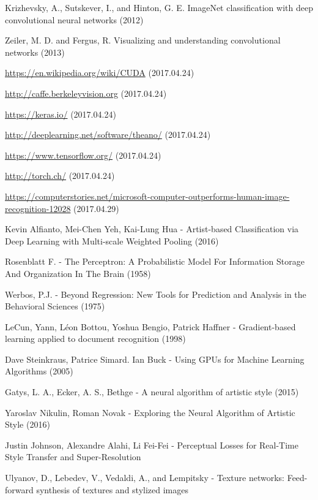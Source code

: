\documentclass[12pt, a4paper, oneside]{book}
\theoremstyle{tetel}
\begin{document}
\newpage
\begin{thebibliography}{1}

Krizhevsky, A., Sutskever, I., and Hinton, G. E. ImageNet classification with deep convolutional neural networks (2012)

Zeiler, M. D. and Fergus, R. Visualizing and understanding convolutional networks (2013)

\url {https://en.wikipedia.org/wiki/CUDA} (2017.04.24)

\url {http://caffe.berkeleyvision.org} (2017.04.24)

\url {https://keras.io/} (2017.04.24)

\url {http://deeplearning.net/software/theano/} (2017.04.24)

\url {https://www.tensorflow.org/} (2017.04.24)

\url {http://torch.ch/} (2017.04.24)

\url {https://computerstories.net/microsoft-computer-outperforms-human-image-recognition-12028} (2017.04.29)

Kevin Alfianto, Mei-Chen Yeh, Kai-Lung Hua - Artist-based Classification via Deep Learning with Multi-scale Weighted Pooling (2016)

Rosenblatt F. - The Perceptron: A Probabilistic Model For Information Storage And Organization In The Brain (1958)

Werbos, P.J. - Beyond Regression: New Tools for Prediction and Analysis in the Behavioral Sciences (1975)
 
LeCun, Yann, Léon Bottou, Yoshua Bengio, Patrick Haffner - Gradient-based learning applied to document recognition (1998)

Dave Steinkraus, Patrice Simard. Ian Buck - Using GPUs for Machine Learning Algorithms (2005)

Gatys, L. A., Ecker, A. S., Bethge - A neural algorithm of artistic style (2015)

Yaroslav Nikulin, Roman Novak - Exploring the Neural Algorithm of Artistic Style (2016)

Justin Johnson, Alexandre Alahi, Li Fei-Fei - Perceptual Losses for Real-Time Style Transfer and Super-Resolution

Ulyanov, D., Lebedev, V., Vedaldi, A., and Lempitsky - Texture networks: Feed-forward synthesis of textures and stylized images


\end{thebibliography}
\end{document}
